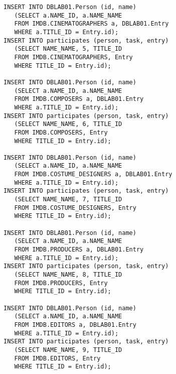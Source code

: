 \documentclass[11pt,a4paper,DIV=9]{scrartcl}
\begin{document}
\begin{lstlisting}
INSERT INTO DBLAB01.Person (id, name)
   (SELECT a.NAME_ID, a.NAME_NAME
   FROM IMDB.CINEMATOGRAPHERS a, DBLAB01.Entry
   WHERE a.TITLE_ID = Entry.id);
INSERT INTO participates (person, task, entry)
   (SELECT NAME_NAME, 5, TITLE_ID
   FROM IMDB.CINEMATOGRAPHERS, Entry
   WHERE TITLE_ID = Entry.id);

INSERT INTO DBLAB01.Person (id, name)
   (SELECT a.NAME_ID, a.NAME_NAME
   FROM IMDB.COMPOSERS a, DBLAB01.Entry
   WHERE a.TITLE_ID = Entry.id);
INSERT INTO participates (person, task, entry)
   (SELECT NAME_NAME, 6, TITLE_ID
   FROM IMDB.COMPOSERS, Entry
   WHERE TITLE_ID = Entry.id);

INSERT INTO DBLAB01.Person (id, name)
   (SELECT a.NAME_ID, a.NAME_NAME
   FROM IMDB.COSTUME_DESIGNERS a, DBLAB01.Entry
   WHERE a.TITLE_ID = Entry.id);
INSERT INTO participates (person, task, entry)
   (SELECT NAME_NAME, 7, TITLE_ID
   FROM IMDB.COSTUME_DESIGNERS, Entry
   WHERE TITLE_ID = Entry.id);

INSERT INTO DBLAB01.Person (id, name)
   (SELECT a.NAME_ID, a.NAME_NAME
   FROM IMDB.PRODUCERS a, DBLAB01.Entry
   WHERE a.TITLE_ID = Entry.id);
INSERT INTO participates (person, task, entry)
   (SELECT NAME_NAME, 8, TITLE_ID
   FROM IMDB.PRODUCERS, Entry
   WHERE TITLE_ID = Entry.id);

INSERT INTO DBLAB01.Person (id, name)
   (SELECT a.NAME_ID, a.NAME_NAME
   FROM IMDB.EDITORS a, DBLAB01.Entry
   WHERE a.TITLE_ID = Entry.id);
INSERT INTO participates (person, task, entry)
   (SELECT NAME_NAME, 9, TITLE_ID
   FROM IMDB.EDITORS, Entry
   WHERE TITLE_ID = Entry.id);
\end{lstlisting}
\end{document}
